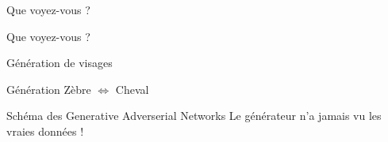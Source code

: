 \begin{frame}{Que voyez-vous ?}
\end{frame}

\begin{frame}{Que voyez-vous ?}
\end{frame}

\begin{frame}{Génération de visages}
\end{frame}

\begin{frame}{Génération Zèbre $\iff$ Cheval}
\end{frame}

\begin{frame}{Schéma des Generative Adverserial Networks}
  Le générateur n'a jamais vu les vraies données !
\end{frame}
